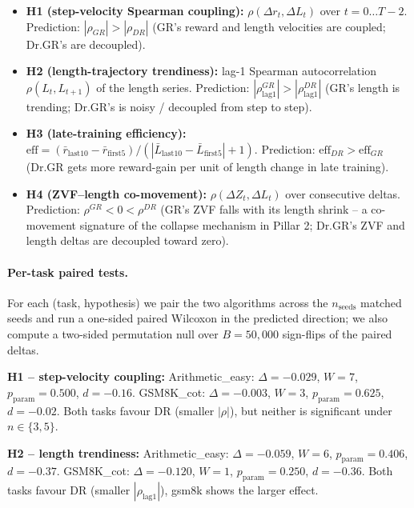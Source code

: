 \documentclass{article}
\begin{document}
\begin{itemize}
\item \textbf{H1 (step-velocity Spearman coupling):}
  $\rho(\Delta r_t, \Delta L_t)$ over $t = 0 \ldots T-2$.
  Prediction: $| \rho_{GR} | > | \rho_{DR} |$
  (GR's reward and length velocities are coupled; Dr.GR's are decoupled).
\item \textbf{H2 (length-trajectory trendiness):}
  lag-1 Spearman autocorrelation $\rho(L_t, L_{t+1})$ of the length series.
  Prediction: $| \rho^{GR}_{\mathrm{lag}1} | > | \rho^{DR}_{\mathrm{lag}1} |$
  (GR's length is trending; Dr.GR's is noisy / decoupled from step to step).
\item \textbf{H3 (late-training efficiency):}
  $\mathrm{eff} = ( \bar r_{\mathrm{last10}} - \bar r_{\mathrm{first5}} )
                / ( | \bar L_{\mathrm{last10}} - \bar L_{\mathrm{first5}} | + 1 )$.
  Prediction: $\mathrm{eff}_{DR} > \mathrm{eff}_{GR}$
  (Dr.GR gets more reward-gain per unit of length change in late training).
\item \textbf{H4 (ZVF--length co-movement):}
  $\rho(\Delta Z_t, \Delta L_t)$ over consecutive deltas.
  Prediction: $\rho^{GR} < 0 < \rho^{DR}$ (GR's ZVF falls with its length
  shrink -- a co-movement signature of the collapse mechanism in Pillar 2;
  Dr.GR's ZVF and length deltas are decoupled toward zero).
\end{itemize}

\paragraph{Per-task paired tests.}
For each (task, hypothesis) we pair the two algorithms across the
$n_{\mathrm{seeds}}$ matched seeds and run a one-sided paired Wilcoxon
in the predicted direction; we also compute a two-sided permutation
null over $B = 50{,}000$ sign-flips of the paired deltas.

\textbf{H1 -- step-velocity coupling:}
Arithmetic\_easy: $\Delta = -0.029$, $W=7$, $p_{\mathrm{param}}=0.500$,
$d = -0.16$.  GSM8K\_cot: $\Delta = -0.003$, $W=3$, $p_{\mathrm{param}}=0.625$,
$d = -0.02$.  Both tasks favour DR (smaller $|\rho|$), but neither is
significant under $n \in \{3, 5\}$.

\textbf{H2 -- length trendiness:}
Arithmetic\_easy: $\Delta = -0.059$, $W=6$, $p_{\mathrm{param}}=0.406$,
$d = -0.37$.  GSM8K\_cot: $\Delta = -0.120$, $W=1$, $p_{\mathrm{param}}=0.250$,
$d = -0.36$.  Both tasks favour DR (smaller $|\rho_{\mathrm{lag}1}|$),
gsm8k shows the larger effect.
\end{document}
